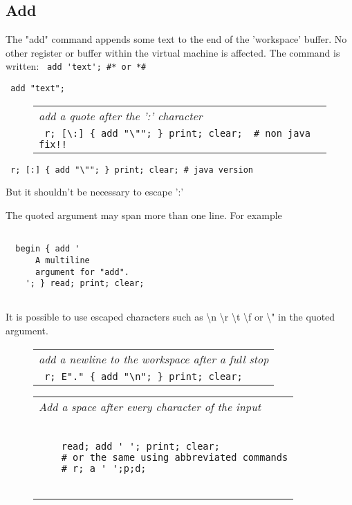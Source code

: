 \documentclass[a4paper,12pt]{article}
\begin{document}
\subsection{Add}
  
  The "add" command appends some text to the end of the 'workspace'
  buffer. No other register or buffer within the virtual machine is
  affected. The command is written: 
 \verb| add 'text'; #* or *# |
 
 \verb| add "text"; |

 \begin{figure}
 \begin{tabular}{ l }
 \emph{ add a quote after the ':' character } \\ 
 \verb| r; [\:] { add "\""; } print; clear;  # non java fix!! |
 \end{tabular} 
 \end{figure} 
 \verb| r; [:] { add "\""; } print; clear; # java version |


  But it shouldn't be necessary to escape ':'

  The quoted argument may span more than one line. For example 
 \begin{lstlisting}[breaklines] 

  begin { add '
      A multiline 
      argument for "add".
    '; } read; print; clear;
  
 \end{lstlisting} 

  
  It is possible to use escaped characters such as \textbackslash n \textbackslash r \textbackslash t \textbackslash f or \textbackslash " in
  the quoted argument.
 \begin{figure}
 \begin{tabular}{ l }
 \emph{ add a newline to the workspace after a full stop } \\ 
 \verb| r; E"." { add "\n"; } print; clear; |
 \end{tabular} 
 \end{figure}
 \begin{figure}
 \begin{tabular}{ l }
 \emph{ Add a space after every character of the input  } \\ 
 \begin{lstlisting}[breaklines] 

    read; add ' '; print; clear;
    # or the same using abbreviated commands
    # r; a ' ';p;d;  
  
 \end{lstlisting} 
 \end{tabular} 

 \end{figure}
  
\end{document}
